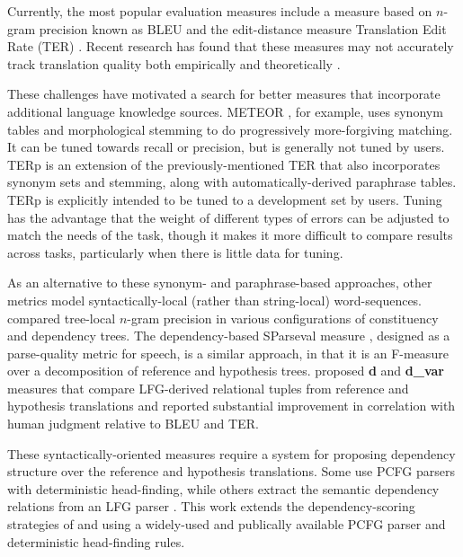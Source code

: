 \documentclass{kluwer}    %
\begin{document}
\begin{article}
Currently, the most popular evaluation measures include a measure
based on $n$-gram precision known as BLEU \cite{papineni02bleu} and
the edit-distance measure Translation Edit Rate (TER)
\cite{snover06ter}.  Recent research has found that these measures may
not accurately track translation quality both empirically
\cite{charniak03syntaxlmmt} and theoretically
\cite{callisonburch06bleuproblems}.

These challenges have motivated a search for better measures that
incorporate additional language knowledge sources.  METEOR
\cite{banerjee05meteor}, for example, uses synonym tables and
morphological stemming to do progressively more-forgiving matching.
It can be tuned towards recall or precision, but is generally not
tuned by users.  TERp \cite{snover09terp} is an extension of the
previously-mentioned TER that also incorporates synonym sets and stemming, along
with automatically-derived paraphrase tables.  TERp is explicitly
intended to be tuned to a development set by users.
%
Tuning has the advantage that the weight of different types of errors
can be adjusted to match the needs of the task, though it makes it
more difficult to compare results across tasks, particularly when
there is little data for tuning.

As an alternative to these synonym- and paraphrase-based approaches,
other metrics model syntactically-local (rather than string-local)
word-sequences.  compared tree-local
$n$-gram precision in various configurations of constituency and
dependency trees.  The dependency-based SParseval measure
\cite{roark06:sparseval}, designed as a parse-quality metric for
speech, is a similar approach, in that it is an F-measure over a
decomposition of reference and hypothesis trees.
 proposed \textbf{d} and
\textbf{d\_var} measures that compare LFG-derived relational tuples
from reference and hypothesis translations and reported substantial
improvement in correlation with human judgment relative to BLEU and
TER.

These syntactically-oriented measures require a system for proposing
dependency structure over the reference and hypothesis
translations. Some \cite{liu05syntaxformteval,roark06:sparseval} use
PCFG parsers with deterministic head-finding, while others
\cite{owczarzak07labelleddepseval} extract the semantic dependency
relations from an LFG parser \cite{cahill04lfg}.
%
This work extends the dependency-scoring strategies of
 and
 using a widely-used and
publically available PCFG parser and deterministic head-finding rules.
 

\end{article}
\end{document}
